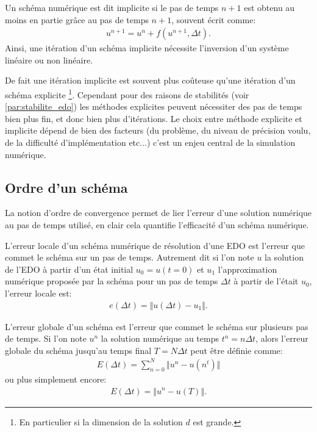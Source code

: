 \begin{definition}
    Un schéma numérique est dit implicite si le pas de temps $n+1$ est obtenu au moins en partie grâce au pas de temps $n+1$, souvent écrit comme:
    \begin{align}
        u^{n+1} = u^n + f(u^{n+1} ,\Delta t ).
    \end{align}
    Ainsi, une itération d'un schéma implicite nécessite l'inversion d'un système linéaire ou non linéaire. 
\end{definition}
De fait une itération implicite est souvent plus coûteuse qu'une itération d'un schéma explicite
\footnote{En particulier si la dimension de la solution $d$ est grande.}. 
Cependant pour des raisons de stabilités (voir \ref{par:stabilite_edo}) les méthodes explicites peuvent nécessiter des pas de temps bien plus fin, et donc bien plus d'itérations.
Le choix entre méthode explicite et implicite dépend de bien des facteurs (du problème, du niveau de précision voulu, de la difficulté d'implémentation etc...)
c'est un enjeu central de la simulation numérique.
\subsection{Ordre d'un schéma}
La notion d'ordre de convergence permet de lier l'erreur d'une solution numérique au pas de temps utilisé, en clair cela quantifie l'efficacité d'un schéma numérique.
\begin{definition}
    L'erreur locale d'un schéma numérique de résolution d'une EDO est l'erreur que commet le schéma sur un pas de temps.
    Autrement dit si l'on note $u$ la solution de l'EDO à partir d'un état initial $u_0 = u(t=0)$ et $u_1$ l'approximation numérique proposée par la schéma 
    pour un pas de temps $\Delta t$ à partir de l'était $u_0$, l'erreur locale est: 
    \begin{align}
        e(\Delta t) = \Vert u(\Delta t) - u_1 \Vert.
    \end{align}
\end{definition}

\begin{definition}
    L'erreur globale d'un schéma est l'erreur que commet le schéma sur plusieurs pas de temps. 
    Si l'on note $u^n$ la solution numérique au temps $t^n = n \Delta t$, alors l'erreur globale du schéma jusqu'au temps final $T = N \Delta t$ peut être définie comme:
    \begin{align}
        E(\Delta t) = \sum_{n=0}^N \Vert u^n - u(n^t) \Vert 
    \end{align}
    ou plus simplement encore:
    \begin{align}
        E(\Delta t)=\Vert u^n - u(T) \Vert.
    \end{align}
\end{definition}

